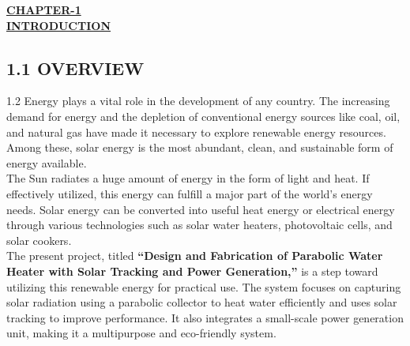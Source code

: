 \begin{center}
  {\fontsize{15}{18}\selectfont \bfseries \textcolor{red!80!black}{\underline{CHAPTER-1}}}\\[2mm]
  {\fontsize{16}{20}\selectfont \bfseries \textcolor{red!80!black}{\underline{INTRODUCTION}}}\\[6mm]
\end{center}

\subsection*{1.1 OVERVIEW}
\noindent
\begin{spacing}{1.2}
{\fontsize{10.5}{14.5}\selectfont
Energy plays a vital role in the development of any country. The increasing demand for energy and the depletion of conventional energy sources like coal, oil, and natural gas have made it necessary to explore renewable energy resources. Among these, solar energy is the most abundant, clean, and sustainable form of energy available.\\[3mm]
The Sun radiates a huge amount of energy in the form of light and heat. If effectively utilized, this energy can fulfill a major part of the world's energy needs. Solar energy can be converted into useful heat energy or electrical energy through various technologies such as solar water heaters, photovoltaic cells, and solar cookers.\\[3mm]
The present project, titled \textbf{``Design and Fabrication of Parabolic Water Heater with Solar Tracking and Power Generation,''} is a step toward utilizing this renewable energy for practical use. The system focuses on capturing solar radiation using a parabolic collector to heat water efficiently and uses solar tracking to improve performance. It also integrates a small-scale power generation unit, making it a multipurpose and eco-friendly system.
}
\end{spacing}

\vspace{5mm}
